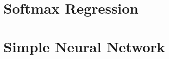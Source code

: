 \documentclass{article}
\begin{document}
\section{Softmax Regression}





\section{Simple Neural Network}
\end{document}

